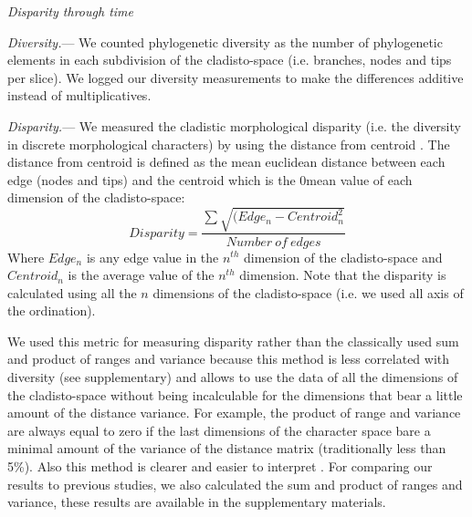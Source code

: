 \documentclass[12pt,letterpaper]{article}
\renewcommand{\subsection}[1]{%
\bigskip
\begin{center}
\begin{large}
\normalfont\itshape #1
\end{large}
\end{center}}
\renewcommand{\subsubsection}[1]{%
\vspace{2ex}
\noindent
\textit{#1.}---}
\begin{document}
\subsection{Disparity through time}
\subsubsection{Diversity}
We counted phylogenetic diversity as the number of phylogenetic elements in each subdivision of the cladisto-space (i.e. branches, nodes and tips per slice). We logged our diversity measurements to make the differences additive instead of multiplicatives.

\subsubsection{Disparity}
We measured the cladistic morphological disparity (i.e. the diversity in discrete morphological characters) by using the distance from centroid \citep{finlay2015morphological}. The distance from centroid is defined as the mean euclidean distance between each edge (nodes and tips) and the centroid which is the 0mean value of each dimension of the cladisto-space:
\begin{equation}
Disparity=\frac{\sum{\sqrt{(Edge_{n}-Centroid_{n}^2}}}{Number\ of\ edges}
\end{equation}
Where $Edge_{n}$ is any edge value in the $n^{th}$ dimension of the cladisto-space and $Centroid_{n}$ is the average value of the $n^{th}$ dimension. Note that the disparity is calculated using all the $n$ dimensions of the cladisto-space (i.e. we used all axis of the ordination).

We used this metric for measuring disparity rather than the classically used sum and product of ranges and variance \citep[e.g.][]{Wills1994,Foote29111996,Wesley-Hunt2005,Brusatte12092008,ruta2013} %
because this method is less correlated with diversity (see supplementary) and allows to use the data of all the dimensions of the cladisto-space without being incalculable for the dimensions that bear a little amount of the distance variance. For example, the product of range and variance are always equal to zero if the last dimensions of the character space bare a minimal amount of the variance of the distance matrix (traditionally less than 5\%). Also this method is clearer and easier to interpret \citep{finlay2015morphological}. For comparing our results to previous studies, we also calculated the sum and product of ranges and variance, these results are available in the supplementary materials.
\end{document}
